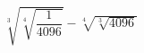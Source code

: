 \begin{ex}[type=calculate]
	\begin{condition}
		\( \sqrt[3]{\sqrt[4]{\dfrac{1}{4096}}}-\sqrt[4]{\sqrt[3]{4096}} \)
	\end{condition}
\end{ex}